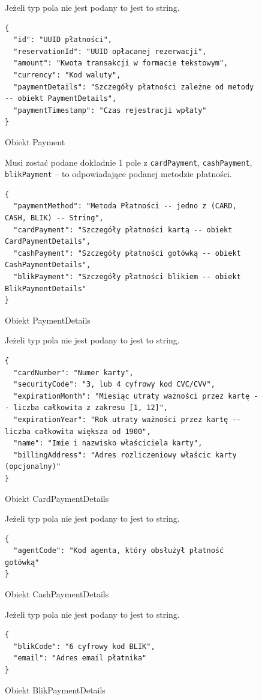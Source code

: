 \begin{figure}[H]
Jeżeli typ pola nie jest podany to jest to string.
\begin{verbatim}
{
  "id": "UUID płatności",
  "reservationId": "UUID opłacanej rezerwacji",
  "amount": "Kwota transakcji w formacie tekstowym",
  "currency": "Kod waluty",
  "paymentDetails": "Szczegóły płatności zależne od metody -- obiekt PaymentDetails",
  "paymentTimestamp": "Czas rejestracji wpłaty"
}
\end{verbatim}
\caption{Obiekt Payment}
\label{schema:payment}
\end{figure}
\begin{figure}[H]
Musi zostać podane dokładnie 1 pole z \texttt{cardPayment}, \texttt{cashPayment}, \texttt{blikPayment} -- to odpowiadające podanej metodzie płatności.
\begin{verbatim}
{
  "paymentMethod": "Metoda Płatności -- jedno z (CARD, CASH, BLIK) -- String",
  "cardPayment": "Szczegóły płatności kartą -- obiekt CardPaymentDetails",
  "cashPayment": "Szczegóły płatności gotówką -- obiekt CashPaymentDetails",
  "blikPayment": "Szczegóły płatności blikiem -- obiekt BlikPaymentDetails"
}
\end{verbatim}
\caption{Obiekt PaymentDetails}
\label{schema:paymentDetails}
\end{figure}
\begin{figure}[H]
Jeżeli typ pola nie jest podany to jest to string.
\begin{verbatim}
{
  "cardNumber": "Numer karty",
  "securityCode": "3, lub 4 cyfrowy kod CVC/CVV",
  "expirationMonth": "Miesiąc utraty ważności przez kartę -- liczba całkowita z zakresu [1, 12]",
  "expirationYear": "Rok utraty ważności przez kartę -- liczba całkowita większa od 1900",
  "name": "Imie i nazwisko właściciela karty",
  "billingAddress": "Adres rozliczeniowy właścic karty (opcjonalny)"
}
\end{verbatim}
\caption{Obiekt CardPaymentDetails}
\label{schema:cardPaymentDetails}
\end{figure}
\begin{figure}[H]
Jeżeli typ pola nie jest podany to jest to string.
\begin{verbatim}
{
  "agentCode": "Kod agenta, który obsłużył płatność gotówką"
}
\end{verbatim}
\caption{Obiekt CashPaymentDetails}
\label{schema:cashPaymentDetails}
\end{figure}
\begin{figure}[H]
Jeżeli typ pola nie jest podany to jest to string.
\begin{verbatim}
{
  "blikCode": "6 cyfrowy kod BLIK",
  "email": "Adres email płatnika"
}
\end{verbatim}
\caption{Obiekt BlikPaymentDetails}
\label{schema:blikPaymentDetails}
\end{figure}


